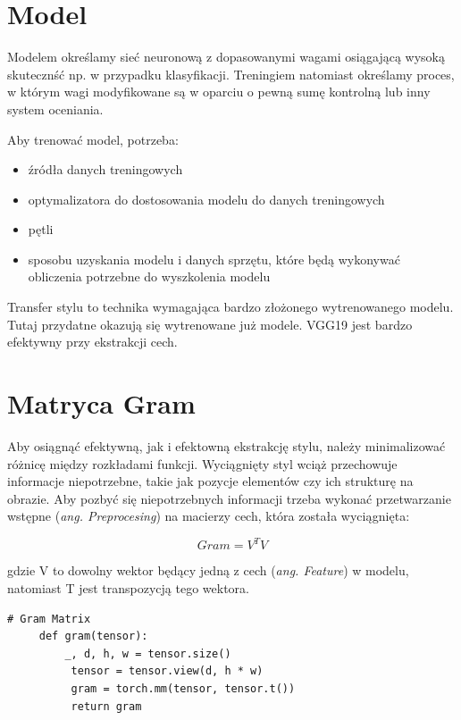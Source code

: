 \documentclass[openright]{xmgr}
\begin{document}
\section{Model\label{s:dsssl}}
  \indent \indent Modelem określamy sieć neuronową z dopasowanymi wagami osiągającą wysoką skutecznść np. w przypadku klasyfikacji. Treningiem natomiast określamy proces, w którym wagi modyfikowane są w oparciu o pewną sumę kontrolną lub inny system oceniania.

Aby trenować model, potrzeba:

\begin{itemize}
\item źródła danych treningowych
\item optymalizatora do dostosowania modelu do danych treningowych 
\item pętli  
\item sposobu uzyskania modelu i danych sprzętu, które będą wykonywać obliczenia potrzebne do wyszkolenia modelu

\end{itemize}

Transfer stylu to technika wymagająca bardzo złożonego wytrenowanego modelu. Tutaj przydatne okazują się wytrenowane już modele. VGG19 jest bardzo efektywny przy ekstrakcji cech.
\clearpage
\section{Matryca Gram\label{s:dsssl}}
  \indent \indent Aby osiągnąć efektywną, jak i efektowną ekstrakcję stylu, należy minimalizować różnicę między rozkładami funkcji. Wyciągnięty styl wciąż przechowuje informacje niepotrzebne, takie jak pozycje elementów czy ich strukturę na obrazie. Aby pozbyć się niepotrzebnych informacji trzeba wykonać przetwarzanie wstępne (\textit{ang. Preprocesing}) na macierzy cech, która została wyciągnięta:

\begin{equation}
Gram = V^TV
\end{equation}

gdzie V to dowolny wektor będący jedną z cech (\textit{ang. Feature}) w modelu, natomiast T jest transpozycją tego wektora. 
\begin{lstlisting}
# Gram Matrix
	 def gram(tensor):
	 	 _, d, h, w = tensor.size()
          tensor = tensor.view(d, h * w)
          gram = torch.mm(tensor, tensor.t())
          return gram
\end{lstlisting}
\end{document}
